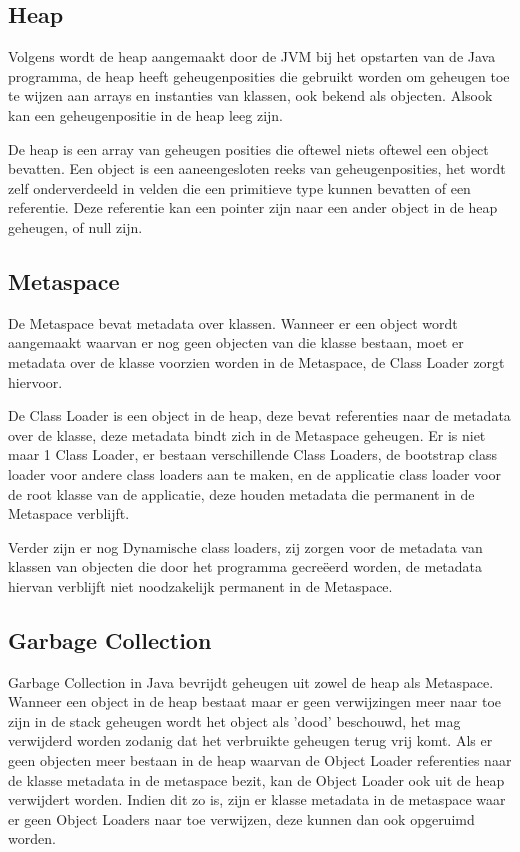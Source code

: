     \subsection{Heap}
    \label{sec:heap}
    Volgens \textcite{Grgic2018} wordt de heap aangemaakt door de JVM bij het opstarten van de Java programma, de heap heeft geheugenposities die gebruikt worden om geheugen toe te wijzen aan arrays en instanties van klassen, ook bekend als objecten.
    Alsook kan een geheugenpositie in de heap leeg zijn.
    
    De heap is een array van geheugen posities die oftewel niets oftewel een object bevatten.
    Een object is een aaneengesloten reeks van geheugenposities, het wordt zelf onderverdeeld in velden die een primitieve type kunnen bevatten of een referentie.
    Deze referentie kan een pointer zijn naar een ander object in de heap geheugen, of null zijn.\autocite{Bruno2018}
    \subsection{Metaspace}
    \label{sec:Metaspace}
    De Metaspace bevat metadata over klassen.
    Wanneer er een object wordt aangemaakt waarvan er nog geen objecten van die klasse bestaan, moet er metadata over de klasse voorzien worden in de Metaspace, de Class Loader zorgt hiervoor.
    
    De Class Loader is een object in de heap, deze bevat referenties naar de metadata over de klasse, deze metadata bindt zich in de Metaspace geheugen.
    Er is niet maar 1 Class Loader, er bestaan verschillende Class Loaders, de bootstrap class loader voor andere class loaders aan te maken, en de applicatie class loader voor de root klasse van de applicatie, deze houden metadata die permanent in de Metaspace verblijft.
    
    Verder zijn er nog Dynamische class loaders, zij zorgen voor de metadata van klassen van objecten die door het programma gecreëerd worden, de metadata hiervan verblijft niet noodzakelijk permanent in de Metaspace.
    \autocite{Putten2022}
    \subsection{Garbage Collection}
    \label{sec:garbage collection}
    Garbage Collection in Java bevrijdt geheugen uit zowel de heap als Metaspace.
    Wanneer een object in de heap bestaat maar er geen verwijzingen meer naar toe zijn in de stack geheugen wordt het object als 'dood' beschouwd, het mag verwijderd worden zodanig dat het verbruikte geheugen terug vrij komt.
    Als er geen objecten meer bestaan in de heap waarvan de Object Loader referenties naar de klasse metadata in de metaspace bezit, kan de Object Loader ook uit de heap verwijdert worden.
    Indien dit zo is, zijn er klasse metadata in de metaspace waar er geen Object Loaders naar toe verwijzen, deze kunnen dan ook opgeruimd worden. \autocite{Putten2022}
    
